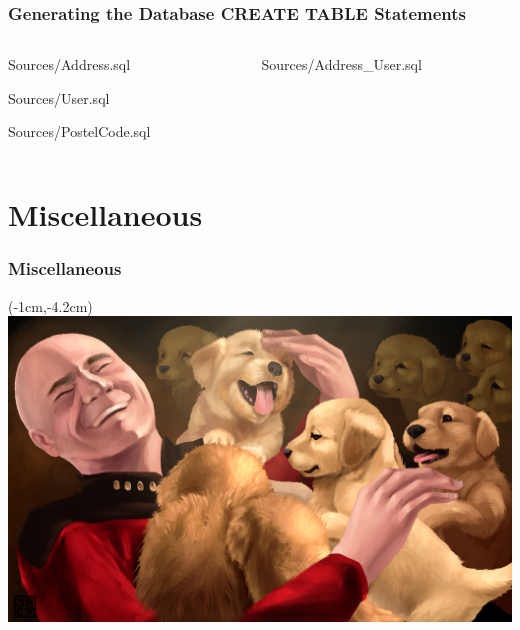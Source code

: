 \documentclass[xelatex,13pt]{beamer}
\begin{document}
\begin{frame}
	\frametitle{Generating the Database CREATE TABLE Statements}
	\begin{columns}[T]
		\begin{column}{0.49\linewidth}
	
		{Sources/Address.sql}
	
			{Sources/User.sql}
	
			{Sources/PostelCode.sql}
		\end{column}
		\begin{column}{0.49\linewidth}
	
			{Sources/Address_User.sql}
		\end{column}
		
	\end{columns}
\end{frame}

\section{Miscellaneous}
\begin{frame}
	\frametitle{Miscellaneous}
\end{frame}

\begin{frame}[plain]
\begin{textblock*}{0cm}(-1cm,-4.2cm)
	\includegraphics[width=1.0\paperwidth]{picardpuppy.png}
\end{textblock*}
\end{frame}
\end{document}
